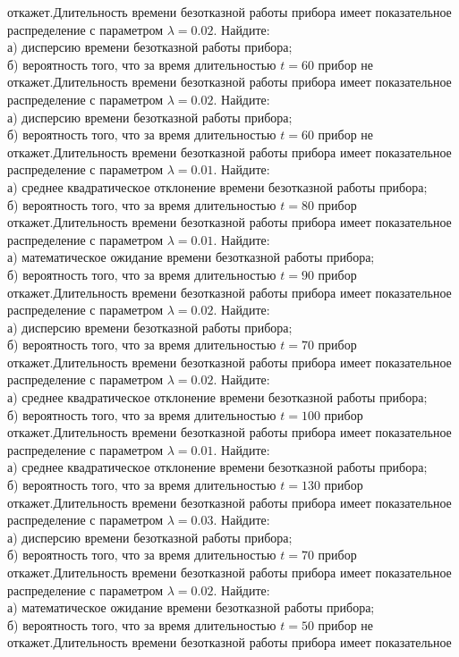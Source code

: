 откажет.Длительность времени безотказной работы прибора имеет показательное распределение с параметром $\lambda = 0.02$. Найдите: \\ \quad а) дисперсию времени безотказной работы прибора; \\ \quad б) вероятность того, что за время длительностью $t = 60$ прибор не откажет.Длительность времени безотказной работы прибора имеет показательное распределение с параметром $\lambda = 0.02$. Найдите: \\ \quad а) дисперсию времени безотказной работы прибора; \\ \quad б) вероятность того, что за время длительностью $t = 60$ прибор не откажет.Длительность времени безотказной работы прибора имеет показательное распределение с параметром $\lambda = 0.01$. Найдите: \\ \quad а) среднее квадратическое отклонение времени безотказной работы прибора; \\ \quad б) вероятность того, что за время длительностью $t = 80$ прибор откажет.Длительность времени безотказной работы прибора имеет показательное распределение с параметром $\lambda = 0.01$. Найдите: \\ \quad а) математическое ожидание времени безотказной работы прибора; \\ \quad б) вероятность того, что за время длительностью $t = 90$ прибор откажет.Длительность времени безотказной работы прибора имеет показательное распределение с параметром $\lambda = 0.02$. Найдите: \\ \quad а) дисперсию времени безотказной работы прибора; \\ \quad б) вероятность того, что за время длительностью $t = 70$ прибор откажет.Длительность времени безотказной работы прибора имеет показательное распределение с параметром $\lambda = 0.02$. Найдите: \\ \quad а) среднее квадратическое отклонение времени безотказной работы прибора; \\ \quad б) вероятность того, что за время длительностью $t = 100$ прибор откажет.Длительность времени безотказной работы прибора имеет показательное распределение с параметром $\lambda = 0.01$. Найдите: \\ \quad а) среднее квадратическое отклонение времени безотказной работы прибора; \\ \quad б) вероятность того, что за время длительностью $t = 130$ прибор откажет.Длительность времени безотказной работы прибора имеет показательное распределение с параметром $\lambda = 0.03$. Найдите: \\ \quad а) дисперсию времени безотказной работы прибора; \\ \quad б) вероятность того, что за время длительностью $t = 70$ прибор откажет.Длительность времени безотказной работы прибора имеет показательное распределение с параметром $\lambda = 0.02$. Найдите: \\ \quad а) математическое ожидание времени безотказной работы прибора; \\ \quad б) вероятность того, что за время длительностью $t = 50$ прибор не откажет.Длительность времени безотказной работы прибора имеет показательное 